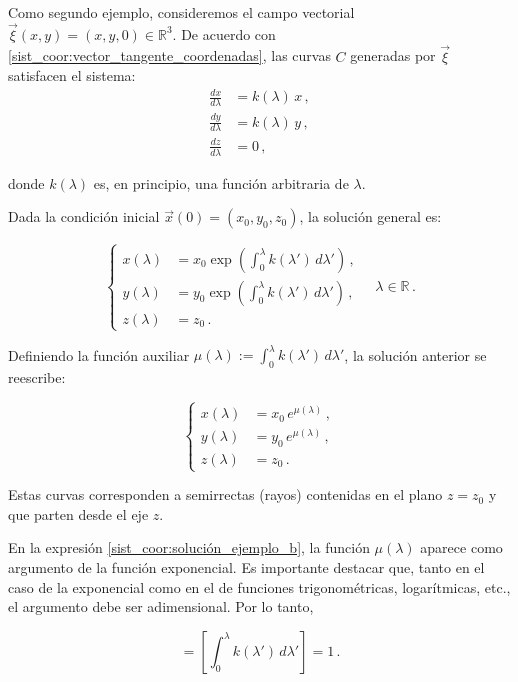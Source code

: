 \documentclass[../apunte_mecanica_clasica.tex]{subfiles}%
\begin{document}
Como segundo ejemplo, consideremos el campo vectorial $\vec{\xi}(x, y) = (x, y, 0) \in \mathbb{R}^3$. De acuerdo con \eqref{sist_coor:vector_tangente_coordenadas}, las curvas $C$ generadas por $\vec{\xi}$ satisfacen el sistema:
\begin{align*}
\frac{dx}{d\lambda} &= k(\lambda)\, x \,,\\
\frac{dy}{d\lambda} &= k(\lambda)\, y \,,\\
\frac{dz}{d\lambda} &= 0 \,,
\end{align*}

donde $k(\lambda)$ es, en principio, una función arbitraria de $\lambda$.

Dada la condición inicial $\vec{x}(0) = (x_0, y_0, z_0)$, la solución general es:

\begin{equation*}
\left\{
\begin{aligned}
x(\lambda) &= x_0 \exp\left(\int_0^\lambda k(\lambda')\, d\lambda'\right)\,, \\
y(\lambda) &= y_0 \exp\left(\int_0^\lambda k(\lambda')\, d\lambda'\right)\,, \\[4pt]
z(\lambda) &= z_0 \,.
\end{aligned}
\right. \quad \lambda \in \mathbb{R} \,.
\end{equation*}

Definiendo la función auxiliar $\mu(\lambda) := \int_0^\lambda k(\lambda')\, d\lambda'$, la solución anterior se reescribe:

\begin{equation}\label{sist_coor:solución_ejemplo_b}
\left\{\begin{aligned}
x(\lambda) &= x_0\, e^{\mu(\lambda)}\,, \\
y(\lambda) &= y_0\, e^{\mu(\lambda)}\,, \\
z(\lambda) &= z_0\,.
\end{aligned}\right.
\end{equation}

Estas curvas corresponden a semirrectas (rayos) contenidas en el plano $z = z_0$ y que parten desde el eje $z$.

En la expresión \eqref{sist_coor:solución_ejemplo_b}, la función $\mu(\lambda)$ aparece como argumento de la función exponencial. Es importante destacar que, tanto en el caso de la exponencial como en el de funciones trigonométricas, logarítmicas, etc., el argumento debe ser adimensional. Por lo tanto,

\begin{equation*}
    [\mu(\lambda)] = \left[\int_0^{\lambda}k(\lambda')\, d\lambda'\right] = 1\,.
\end{equation*}
\end{document}
